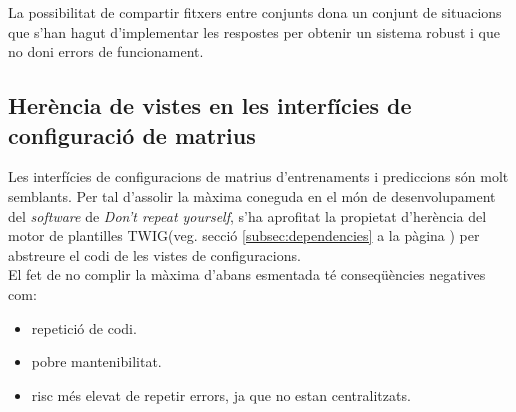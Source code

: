 La possibilitat de compartir fitxers entre conjunts dona un conjunt de situacions que s'han hagut d'implementar les respostes per obtenir un sistema robust i que no doni errors de funcionament.

\subsection*{Herència de vistes en les interfícies de configuració de matrius}
Les interfícies de configuracions de matrius d'entrenaments i prediccions s\'{o}n molt semblants. Per tal d'assolir la màxima coneguda en el m\'{o}n de desenvolupament del \textit{software} de \textit{Don't repeat yourself}\cite{dontrepeat}, s'ha aprofitat la propietat d'herència del motor de plantilles TWIG(veg. secció \ref{subsec:dependencies} a la p\`{a}gina \pageref{subsec:dependencies}) per abstreure el codi de les vistes de configuracions.\cite{herency}\\

El fet de no complir la màxima d'abans esmentada t\'{e} conseqüències negatives com:
\begin{itemize}
\item repetició de codi.
\item pobre mantenibilitat.
\item risc m\'{e}s elevat de repetir errors, ja que no estan centralitzats.
\end{itemize}



